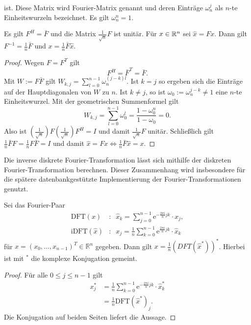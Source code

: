 ist. Diese Matrix wird Fourier-Matrix genannt und deren Einträge $\omega_n^{j}$ als $n$-te Einheitswurzeln bezeichnet. Es gilt $\omega_n^n=1$.
\begin{lem}
    \label{lem:Finv}
    Es gilt $F^H=\bar{F}$ und die Matrix $\frac{1}{\sqrt{n}} F$ ist unitär. Für $x \in \mathbb{R}^n$ sei $\hat{x}=Fx$. Dann gilt $F^{-1}=\frac{1}{n} \bar{F}$ und $x= \frac{1}{n}\bar{F} \hat{x}$.
\end{lem}
\begin{proof}
    Wegen $F=F^T$ gilt 
    \begin{equation*}
        F^H=\bar{{F}}^T=\bar{F}.
    \end{equation*}
    Mit $W:=F\bar{F}$ gilt $W_{k,j}=\sum_{l=0}^{n-1} \omega_n^{(j-k)l}$. Ist $k=j$ so ergeben sich die Einträge auf der Hauptdiagonalen von $W$ zu $n$. Ist $k \neq j$, so ist $\omega_0:=\omega_n^{j-k} \neq 1$ eine $n$-te Einheitswurzel.
    Mit der geometrischen Summenformel gilt
    \begin{equation*}
        W_{k,j}=\sum_{l=0}^{n-1} \omega_0^l=\frac{1-\omega_0^n}{1-\omega_0}=0.
    \end{equation*} 
    Also ist $\left(\frac{1}{\sqrt{n}}\right) F\left(\frac{1}{\sqrt{n}}\right) F^H=I$ und damit $\frac{1}{\sqrt{n}} F$ unitär. Schließlich gilt $\frac{1}{n} \bar{F} F=\frac{1}{n} F \bar{F}= I$ und damit $\hat{x}=Fx \Leftrightarrow \frac{1}{n}\bar{F} \hat{x}=x$.
\end{proof} 
Die inverse diskrete Fourier-Transformation lässt sich mithilfe der diskreten Fourier-Transformation berechnen. Dieser Zusammenhang wird insbesondere für die spätere datenbankgestützte Implementierung der Fourier-Transformationen genutzt.
\begin{lem}
    \label{lem:inversedftasdft}
    Sei das Fourier-Paar
    \begin{align*}
        \mathrm{DFT}(x)&: \; \;\hat{x}_k=\sum_{j=0}^{n-1} \mathrm{e}^{- \frac{2 \pi i}{n} j k} \cdot x_j, \\ 
        \mathrm{iDFT}(\hat{x})&:\; \; x_j= \frac{1}{n} \sum_{k=0}^{n-1} \mathrm{e}^{\frac{2 \pi i}{n} j k} \cdot \hat{x}_k
    \end{align*}
    für $x=(x_0, \ldots, x_{n-1})^T \in \mathbb{R}^n$ gegeben. Dann gilt $x=\frac{1}{n} (DFT(\hat{x}^*))^*$. Hierbei ist mit ${}^*$ die komplexe Konjugation gemeint.
\end{lem}
\begin{proof}
  Für alle $0 \leq j \leq n-1$  gilt
  \begin{align*}
    x_j^{*}&=\frac{1}{n} \sum_{k=0}^{n-1} \mathrm{e}^{-\frac{2 \pi i}{n} j k} \cdot \hat{x}^*_k \\
    &=\frac{1}{n} \mathrm{DFT}(\hat{x}^*)_j.
  \end{align*}
  Die Konjugation auf beiden Seiten liefert die Aussage.
\end{proof}
